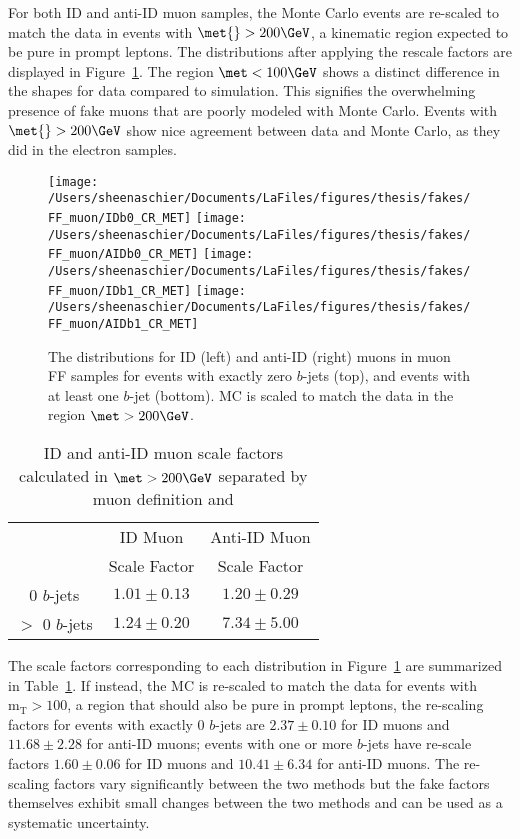  For both ID and anti-ID muon samples, the Monte Carlo events are re-scaled to match the data in events with $\met{}>200\GeV$, a kinematic region expected to be pure in prompt leptons.  The \met distributions after applying the rescale factors are displayed in Figure~\ref{fig:ff_muon_met}.  The region $\met < 100\GeV$ shows a distinct difference in the shapes for data compared to simulation.  This signifies the overwhelming presence of fake muons that are poorly modeled with Monte Carlo.  Events with $\met{}>200\GeV$ show nice agreement between data and Monte Carlo, as they did in the electron samples.    

\begin{figure}[tbp]
  \centering
  \texttt{[image: /Users/sheenaschier/Documents/LaFiles/figures/thesis/fakes/FF\_muon/IDb0\_CR\_MET]}
  \texttt{[image: /Users/sheenaschier/Documents/LaFiles/figures/thesis/fakes/FF\_muon/AIDb0\_CR\_MET]}
    \texttt{[image: /Users/sheenaschier/Documents/LaFiles/figures/thesis/fakes/FF\_muon/IDb1\_CR\_MET]}
      \texttt{[image: /Users/sheenaschier/Documents/LaFiles/figures/thesis/fakes/FF\_muon/AIDb1\_CR\_MET]}
  \caption{The \met{} distributions for ID (left) and anti-ID (right) muons in muon FF samples for events with exactly zero $b$-jets (top), and events with at least one $b$-jet (bottom).  MC is scaled to match the data in the region $\met > 200\GeV$.}
  \label{fig:ff_muon_met}
\end{figure}
\begin{table}[tbp]
  \centering
  \begin{tabular}{|c|c|c|}
    \hline
  &  ID Muon  & Anti-ID Muon \\ 
  &  Scale Factor & Scale Factor\\
    \hline
0 $b$-jets   & $1.01\pm0.13$ &  $1.20\pm0.29$  \\
 $>$ 0 $b$-jets     & $1.24\pm0.20$ &  $7.34\pm5.00$  \\
\hline

    \hline
  \end{tabular}
  \caption{ID and anti-ID muon scale factors calculated in $\met > 200\GeV$ separated by muon definition and }
  \label{tab:ff_muon_sf}
\end{table} 
The scale factors corresponding to each \met distribution in Figure~\ref{fig:ff_muon_met} are summarized in Table~\ref{tab:ff_muon_sf}.  If instead, the MC is re-scaled to match the data for events with $\mathrm{m_T} > 100$\GeV, a region that should also be pure in prompt leptons, the re-scaling factors for events with exactly 0 $b$-jets are $2.37 \pm 0.10$ for ID muons and $11.68 \pm 2.28$ for anti-ID muons; events with one or more $b$-jets have re-scale factors $1.60 \pm 0.06$ for ID muons and $10.41 \pm 6.34$ for anti-ID muons. The re-scaling factors vary significantly between the two methods but the fake factors themselves exhibit small changes between the two methods and can be used as a systematic uncertainty.

